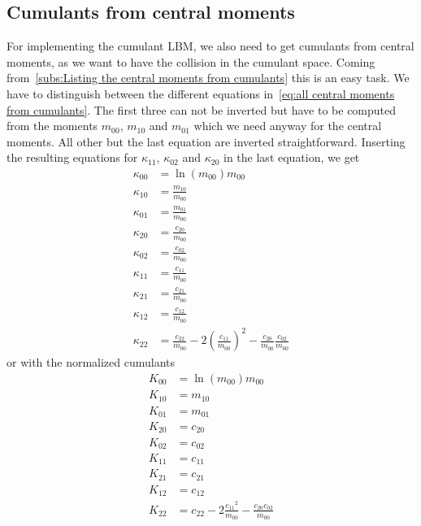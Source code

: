 \subsection{Cumulants from central moments}
\label{sub:Cumulants from central moments}
For implementing the cumulant LBM, we also need to get cumulants from central moments, as we want to have the collision in the cumulant space. Coming from~\ref{subs:Listing the central moments from cumulants} this is an easy task. We have to distinguish between the different equations in~\eqref{eq:all central moments from cumulants}.
The first three can not be inverted but have to be computed from the moments $m_{00}$, $m_{10}$ and $m_{01}$ which we need anyway for the central moments. All other but the last equation are inverted straightforward.
Inserting the resulting equations for $\kappa_{11}$, $\kappa_{02}$ and $\kappa_{20}$ in the last equation, we get
\begin{equation}
  \label{eq:all cumulants from central moments}
  \begin{aligned}
    \kappa_{00} & = \ln(m_{00})m_{00} \\
    \kappa_{10} & = \frac{m_{10}}{m_{00}} \\
    \kappa_{01} & = \frac{m_{01}}{m_{00}} \\
    \kappa_{20} & = \frac{c_{20}}{m_{00}} \\
    \kappa_{02} & = \frac{c_{02}}{m_{00}} \\
    \kappa_{11} & = \frac{c_{11}}{m_{00}} \\
    \kappa_{21} & = \frac{c_{21}}{m_{00}} \\
    \kappa_{12} & = \frac{c_{12}}{m_{00}} \\
    \kappa_{22} & = \frac{c_{22}}{m_{00}} - 2{\left(\frac{c_{11}}{m_{00}}\right)}^2 - \frac{c_{20}}{m_{00}}\frac{c_{02}}{m_{00}}
  \end{aligned}
\end{equation}
%
or with the normalized cumulants
\begin{equation}
  \begin{aligned}
    \label{eq:all normalized cumulants from central moments}
    K_{00} & = \ln(m_{00})m_{00} \\
    K_{10} & = m_{10} \\
    K_{01} & = m_{01} \\
    K_{20} & = c_{20} \\
    K_{02} & = c_{02} \\
    K_{11} & = c_{11} \\
    K_{21} & = c_{21} \\
    K_{12} & = c_{12} \\
    K_{22} & = c_{22} - 2 \frac{{c_{11}}^2}{m_{00}} - \frac{c_{20}c_{02}}{m_{00}}
  \end{aligned}
\end{equation}

